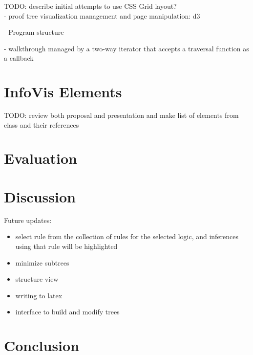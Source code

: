 \documentclass[conference]{IEEEtran}
\begin{document}
TODO: describe initial attempts to use CSS Grid layout? \\

- proof tree visualization management and page manipulation: d3


- Program structure

- walkthrough managed by a two-way iterator that accepts a traversal function as a callback

\section{InfoVis Elements}


TODO: review both proposal and presentation and make list of elements from class and their references

\section{Evaluation}


\section{Discussion}


Future updates:

\begin{itemize}
    \item select rule from the collection of rules for the selected logic, and inferences using that rule will be highlighted
    \item minimize subtrees
    \item structure view
    \item writing to latex
    \item interface to build and modify trees
\end{itemize}


\section{Conclusion}




\end{document}
